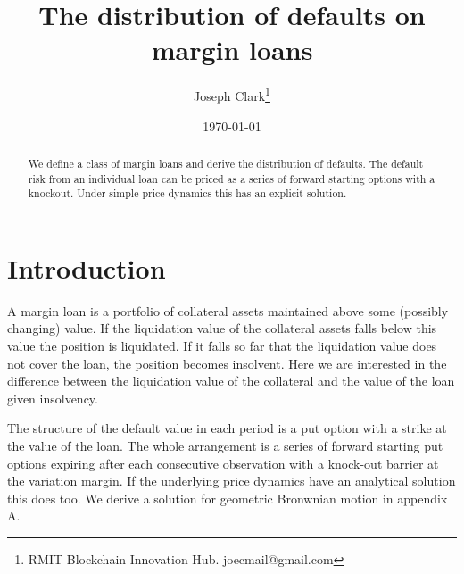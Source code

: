 \documentclass[12pt]{article}
\begin{document}
\begin{titlepage}
\title{The distribution of defaults on margin loans}
\author{Joseph Clark\thanks{RMIT Blockchain Innovation Hub. joecmail@gmail.com} }
\date{\today}
\maketitle
\begin{abstract}
\noindent We define a class of margin loans and derive the distribution of defaults. The default risk from an individual loan can be priced as a series of forward starting options with a knockout. Under simple price dynamics this has an explicit solution.  


\bigskip
\end{abstract}
\setcounter{page}{0}
\thispagestyle{empty}
\end{titlepage}
\pagebreak \newpage




\doublespacing


\section{Introduction} \label{sec:introduction}

A margin loan is a portfolio of collateral assets maintained above some (possibly changing) value. If the liquidation value of the collateral assets falls below this value the position is liquidated. If it falls so far that the liquidation value does not cover the loan, the position becomes insolvent. Here we are interested in the difference between the liquidation value of the collateral and the value of the loan given insolvency.

The structure of the default value in each period is a put option with a strike at the value of the loan. The whole arrangement is a series of forward starting put options expiring after each consecutive observation with a knock-out barrier at the variation margin. If the underlying price dynamics have an analytical solution this does too. We derive a solution for geometric Bronwnian motion in appendix A.
\end{document}
